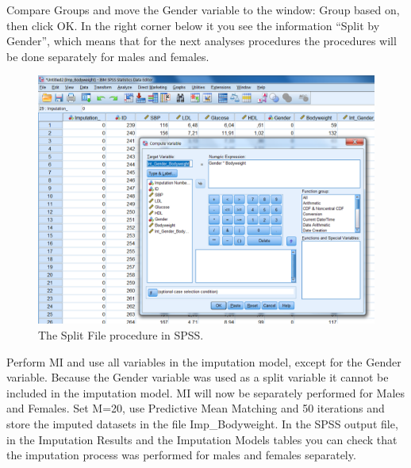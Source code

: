 \documentclass[]{book}
\begin{document}
Compare Groups and move the Gender variable to the window: Group based
on, then click OK. In the right corner below it you see the information
``Split by Gender'', which means that for the next analyses procedures
the procedures will be done separately for males and females.

\begin{figure}

{\centering \includegraphics[width=0.9\linewidth]{images/fig6.3} 

}

\caption{The Split File procedure in SPSS.}\label{fig:fig6-3}
\end{figure}

Perform MI and use all variables in the imputation model, except for the
Gender variable. Because the Gender variable was used as a split
variable it cannot be included in the imputation model. MI will now be
separately performed for Males and Females. Set M=20, use Predictive
Mean Matching and 50 iterations and store the imputed datasets in the
file Imp\_Bodyweight. In the SPSS output file, in the Imputation Results
and the Imputation Models tables you can check that the imputation
process was performed for males and females separately.
\end{document}
